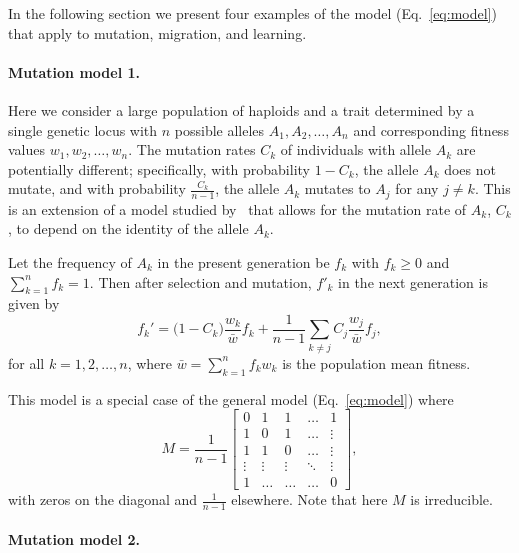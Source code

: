 \documentclass[9pt, a4paper, twocolumn]{extarticle}
\begin{document}
In the following section we present four examples of the model (Eq.~\ref{eq:model}) that apply to mutation, migration, and learning.

\paragraph*{Mutation model 1.}\label{sec:mut_model_1}

Here we consider a large population of haploids and a trait determined by a single genetic locus with $n$ possible alleles $A_1, A_2, \ldots, A_n$ and corresponding fitness values $w_1, w_2, \ldots, w_n$.
The mutation rates $C_k$ of individuals with allele $A_k$ are potentially different;
specifically, with probability $1-C_k$, the allele $A_k$ does not mutate, and with probability $\frac{C_k}{n-1}$, the allele $A_k$ mutates to $A_j$ for any $j \ne k$.
This is an extension of a model studied by~\citet{Altenberg2017} that allows for the mutation rate of $A_k$, $C_k$, to depend on the identity of the allele $A_k$.

Let the frequency of $A_k$ in the present generation be $f_k$ with $f_k \ge 0$ and $\sum_{k=1}^{n}{f_k}=1$.
Then after selection and mutation, $f'_k$ in the next generation is given by
\begin{equation}
f_k' = \big(1 - C_k\big) \frac{w_k}{\bar{w}} f_k + \frac{1}{n-1} \sum_{k \ne j}{C_j \frac{w_j}{\bar{w}} f_j},
\label{eq:mutation_model_1}
\end{equation}
for all $k=1, 2, \ldots, n$, where $\bar{w} = \sum_{k=1}^{n}{f_k w_k}$ is the population mean fitness.

This model is a special case of the general model (Eq.~\ref{eq:model}) where
\begin{equation} 
{M} = \frac{1}{n-1} \begin{bmatrix}
0 & 1 & 1 & \ldots & 1 \\
1 & 0 & 1 & \ldots & \vdots \\
1 & 1 & 0 & \ldots & \vdots \\
\vdots & \vdots & \vdots & \ddots & \vdots \\
1 & \ldots & \ldots & \ldots & 0
\end{bmatrix},
\end{equation}
with zeros on the diagonal and $\frac{1}{n-1}$ elsewhere.
Note that here ${M}$ is irreducible.

\paragraph*{Mutation model 2.}\label{sec:mut_model_2}
\end{document}
